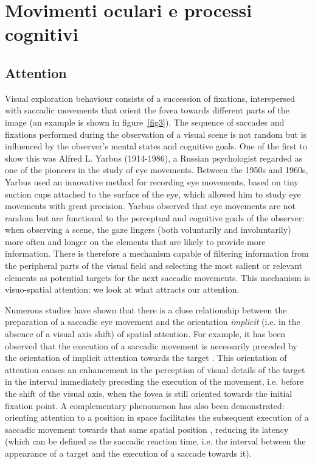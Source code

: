 \documentclass[11pt]{article}
\begin{document}
\break
\section{Movimenti oculari e processi cognitivi}

\subsection{Attention}
Visual exploration behaviour consists of a succession of fixations, interspersed with saccadic movements that orient the fovea towards different parts of the image (an example is shown in figure~\ref{fig3}). The sequence of saccades and fixations performed during the observation of a visual scene is not random but is influenced by the observer's mental states and cognitive goals. One of the first to show this was Alfred L. Yarbus (1914-1986), a Russian psychologist regarded as one of the pioneers in the study of eye movements. Between the 1950s and 1960s, Yarbus used an innovative method for recording eye movements, based on tiny suction cups attached to the surface of the eye, which allowed him to study eye movements with great precision. Yarbus observed that eye movements are not random but are functional to the perceptual and cognitive goals of the observer: when observing a scene, the gaze lingers (both voluntarily and involuntarily) more often and longer on the elements that are likely to provide more information. There is therefore a mechanism capable of filtering information from the peripheral parts of the visual field and selecting the most salient or relevant elements as potential targets for the next saccadic movements. This mechanism is visuo-spatial attention: we look at what attracts our attention.

Numerous studies have shown that there is a close relationship between the preparation of a saccadic eye movement and the orientation \textit{implicit} (i.e. in the absence of a visual axis shift) of spatial attention. For example, it has been observed that the execution of a saccadic movement is necessarily preceded by the orientation of implicit attention towards the target \cite{Deubel1996}. This orientation of attention causes an enhancement in the perception of visual details of the target in the interval immediately preceding the execution of the movement, i.e. before the shift of the visual axis, when the fovea is still oriented towards the initial fixation point. A complementary phenomenon has also been demonstrated: orienting attention to a position in space facilitates the subsequent execution of a saccadic movement towards that same spatial position \cite{Kowler1995}, reducing its latency (which can be defined as the saccadic reaction time, i.e. the interval between the appearance of a target and the execution of a saccade towards it).
\end{document}
